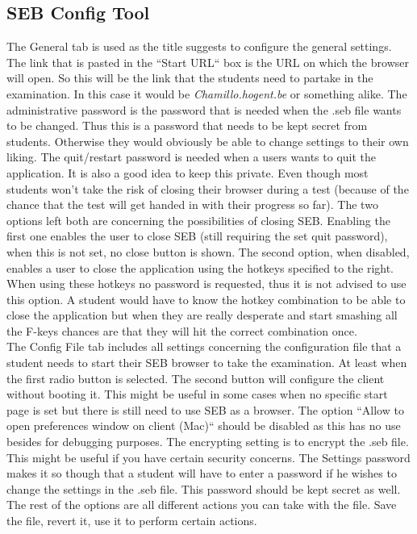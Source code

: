 \subsection{SEB Config Tool}
The General tab is used as the title suggests to configure the general settings. The link that is pasted in the ``Start URL`` box is the URL on which  the browser will open. So this will be the link that the students need to partake in the examination. In this case it would be \textit{Chamillo.hogent.be} or something alike. The administrative password is the password that is needed when the .seb file wants to be changed. Thus this is a password that needs to be kept secret from students. Otherwise they would obviously be able to change settings to their own liking. The quit/restart password is needed when a users wants to quit the application. It is also a good idea to keep this private. Even though most students won't take the risk of closing their browser during a test (because of the chance that the test will get handed in with their progress so far). The two options left both are concerning the possibilities of closing SEB. Enabling the first one enables the user to close SEB (still requiring the set quit password), when this is not set, no close button is shown. The second option, when disabled, enables a user to close the application using the hotkeys specified to the right. When using these hotkeys no password is requested, thus it is not advised to use this option. A student would have to know the hotkey combination to be able to close the application but when they are really desperate and start smashing all the F-keys chances are that they will hit the correct combination once.\\
The Config File tab includes all settings concerning the configuration file that a student needs to start their SEB browser to take the examination. At least when the first radio button is selected. The second button will configure the client without booting it. This might be useful in some cases when no specific start page is set but there is still need to use SEB as a browser.
The option ``Allow to open preferences window on client (Mac)`` should be disabled as this has no use besides for debugging purposes. The encrypting setting is to encrypt the .seb file. This might be useful if you have certain security concerns. The Settings password makes it so though that a student will have to enter a password if he wishes to change the settings in the .seb file. This password should be kept secret as well. The rest of the options are all different actions you can take with the file. Save the file, revert it, use it to perform certain actions.\\
